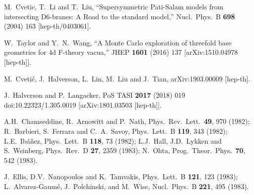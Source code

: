\documentclass[12pt]{article}
\numberwithin{equation}{section}
\begin{document}
\begin{thebibliography}{99}
  M.~Cvetic, T.~Li and T.~Liu,
  ``Supersymmetric Pati-Salam models from intersecting D6-branes: A Road to the standard model,''
  Nucl.\ Phys.\ B {\bf 698} (2004) 163
  [hep-th/0403061].


  W.~Taylor and Y.~N.~Wang,
  ``A Monte Carlo exploration of threefold base geometries for 4d F-theory vacua,''
  JHEP {\bf 1601} (2016) 137
  [arXiv:1510.04978 [hep-th]].


  M.~Cvetič, J.~Halverson, L.~Lin, M.~Liu and J.~Tian,
  arXiv:1903.00009 [hep-th].
  

  J.~Halverson and P.~Langacker,
  PoS TASI {\bf 2017} (2018) 019
  doi:10.22323/1.305.0019
  [arXiv:1801.03503 [hep-th]].
  
  
  
  A.H.~Chamseddine, R.~Arnowitt and P.~Nath,
  Phys.\ Rev.\ Lett.\  {\bf 49}, 970 (1982);
  R.~Barbieri, S.~Ferrara and C.~A.~Savoy,
  Phys.\ Lett.\ B {\bf 119}, 343 (1982);
  L.E.~Ib\'a\~nez, 
  Phys.\ Lett.\ B {\bf 118}, 73 (1982);
  L.J.~Hall, J.D.~Lykken and S.~Weinberg, 
  Phys.\ Rev.\ D {\bf 27}, 2359 (1983);
  N.~Ohta,
  Prog.\ Theor.\ Phys.\  {\bf 70}, 542 (1983).

J.~Ellis, D.V.~Nanopoulos and K.~Tamvakis,
  Phys.\ Lett.\ B {\bf 121}, 123 (1983);
L.~Alvarez-Gaum\'e, J.~Polchinski, and M.~Wise,
  Nucl.\ Phys.\ B {\bf 221}, 495 (1983).


\end{thebibliography}
\end{document}
